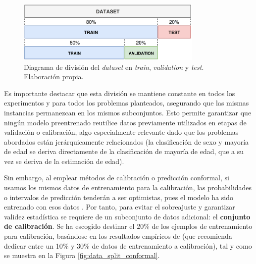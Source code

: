 \begin{figure}[h]
    \centering
    \includegraphics[width=0.8\textwidth]{capitulos/cap_04/imagenes/data_split_base.png}
    \caption[
        Diagrama de división del \textit{dataset} en \textit{train}, \textit{validation} y \textit{test}.
    ]{
        Diagrama de división del \textit{dataset} en \textit{train}, \textit{validation} y \textit{test}. 
        Elaboración propia.
    } 
    \label{fig:data_split_base}
\end{figure}

Es importante destacar que esta división se mantiene constante en todos los experimentos y para todos los 
problemas planteados, asegurando que las mismas instancias permanezcan en los mismos subconjuntos.
Esto permite garantizar que ningún modelo preentrenado reutilice datos previamente utilizados en etapas de 
validación o calibración, algo especialmente relevante dado que los problemas abordados están jerárquicamente 
relacionados (la clasificación de sexo y mayoría de edad se deriva directamente de la clasificación de 
mayoría de edad, que a su vez se deriva de la estimación de edad).

Sin embargo, al emplear métodos de calibración o predicción conformal, si usamos los mismos datos de 
entrenamiento para la calibración, 
las probabilidades o intervalos de predicción tenderán a ser optimistas, pues el modelo ha sido entrenado
con esos datos \cite{niculescu2005}. Por tanto, para evitar el sobreajuste y garantizar validez estadística 
se requiere de un subconjunto de datos adicional: el \textbf{conjunto de calibración}. Se ha escogido destinar
el  20\% de los ejemplos de entrenamiento para calibración, basándose en los resultados empíricos de 
\cite{sesia2020} (que recomienda dedicar entre un 10\% y 30\% de datos de entrenamiento a calibración), 
tal y como se muestra en la Figura \ref{fig:data_split_conformal}.

